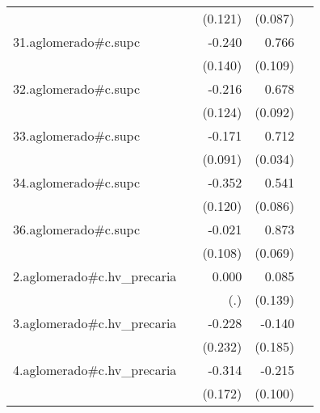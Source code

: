{\begin{longtable}{l*{4}{D{.}{.}{-1}}}
            &                     &     (0.121)         &     (0.087)         &                     \\
\addlinespace
31.aglomerado#c.supc&                     &      -0.240         &       0.766\sym{***}&                     \\
            &                     &     (0.140)         &     (0.109)         &                     \\
\addlinespace
32.aglomerado#c.supc&                     &      -0.216         &       0.678\sym{***}&                     \\
            &                     &     (0.124)         &     (0.092)         &                     \\
\addlinespace
33.aglomerado#c.supc&                     &      -0.171         &       0.712\sym{***}&                     \\
            &                     &     (0.091)         &     (0.034)         &                     \\
\addlinespace
34.aglomerado#c.supc&                     &      -0.352\sym{**} &       0.541\sym{***}&                     \\
            &                     &     (0.120)         &     (0.086)         &                     \\
\addlinespace
36.aglomerado#c.supc&                     &      -0.021         &       0.873\sym{***}&                     \\
            &                     &     (0.108)         &     (0.069)         &                     \\
\addlinespace
2.aglomerado#c.hv\_precaria&                     &       0.000         &       0.085         &                     \\
            &                     &         (.)         &     (0.139)         &                     \\
\addlinespace
3.aglomerado#c.hv\_precaria&                     &      -0.228         &      -0.140         &                     \\
            &                     &     (0.232)         &     (0.185)         &                     \\
\addlinespace
4.aglomerado#c.hv\_precaria&                     &      -0.314         &      -0.215\sym{*}  &                     \\
            &                     &     (0.172)         &     (0.100)         &                     \\

\end{longtable}}
